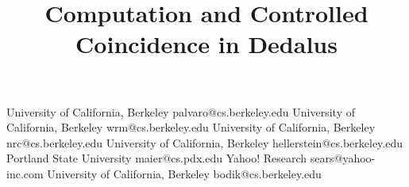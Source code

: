 \documentclass[preprint]{sigplanconf}
\begin{document}
\copyrightdata{[to be supplied]}

\title{Computation and Controlled Coincidence in Dedalus} 
%


           {University of California, Berkeley}
           {palvaro@cs.berkeley.edu}
           {University of California, Berkeley}
           {wrm@cs.berkeley.edu}
           {University of California, Berkeley}
           {nrc@cs.berkeley.edu}
           {University of California, Berkeley}
           {hellerstein@cs.berkeley.edu}
           {Portland State University}
           {maier@cs.pdx.edu}
           {Yahoo! Research}
           {sears@yahoo-inc.com}
           {University of California, Berkeley}
           {bodik@cs.berkeley.edu}
\maketitle
\end{document}
